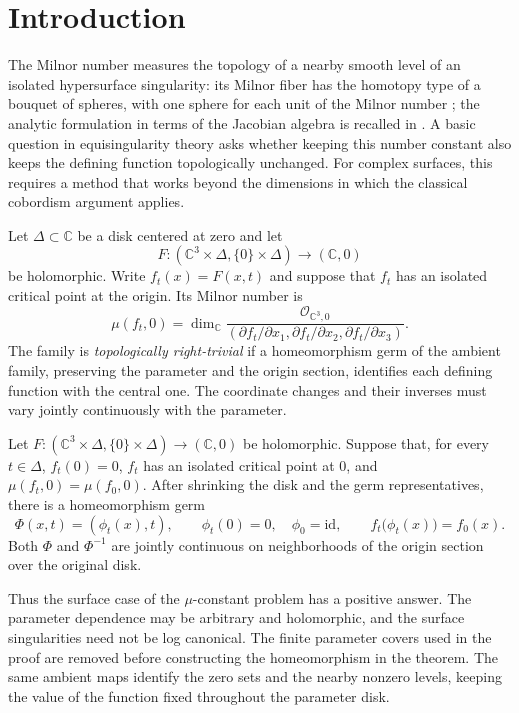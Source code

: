 \section{Introduction}\label{sec:introduction}

The Milnor number measures the topology of a nearby smooth level of an
isolated hypersurface singularity: its Milnor fiber has the homotopy type
of a bouquet of spheres, with one sphere for each unit of the Milnor
number \cite[Theorems~6.5 and~7.2]{Milnor1968}; the analytic
formulation in terms of the Jacobian algebra is recalled in
\cite[Section~1, Theorem~1.5]{LeRamanujam1976}.  A basic question in
equisingularity theory asks whether keeping this number constant also
keeps the defining function topologically unchanged.  For complex
surfaces, this requires a method that works beyond the dimensions in
which the classical cobordism argument applies.

Let $\Delta\subset\mathbb C$ be a disk centered at zero and let
\[
 F:(\mathbb C^3\times\Delta,\{0\}\times\Delta)\longrightarrow(\mathbb C,0)
\]
be holomorphic.  Write $f_t(x)=F(x,t)$ and suppose that $f_t$ has an
isolated critical point at the origin.  Its Milnor number is
\[
 \mu(f_t,0)=\dim_{\mathbb C}
 \frac{\mathcal O_{\mathbb C^3,0}}
 {(\partial f_t/\partial x_1,\partial f_t/\partial x_2,
   \partial f_t/\partial x_3)}.
\]
The family is \emph{topologically right-trivial} if a homeomorphism germ
of the ambient family, preserving the parameter and the origin section,
identifies each defining function with the central one.  The coordinate
changes and their inverses must vary jointly continuously with the
parameter.

\begin{theorem}\label{thm:main}
Let $F:(\mathbb C^3\times\Delta,\{0\}\times\Delta)\to(\mathbb C,0)$
be holomorphic.  Suppose that, for every $t\in\Delta$, $f_t(0)=0$,
$f_t$ has an isolated critical point at $0$, and
$\mu(f_t,0)=\mu(f_0,0)$.  After shrinking the disk and the germ
representatives, there is a homeomorphism germ
\[
 \Phi(x,t)=(\phi_t(x),t),\qquad
 \phi_t(0)=0,\quad \phi_0=\mathrm{id},\qquad
 f_t\bigl(\phi_t(x)\bigr)=f_0(x).
\]
Both $\Phi$ and $\Phi^{-1}$ are jointly continuous on neighborhoods
of the origin section over the original disk.
\end{theorem}

Thus the surface case of the $\mu$-constant problem has a positive
answer.  The parameter dependence may be arbitrary and holomorphic, and
the surface singularities need not be log canonical.  The finite
parameter covers used in the proof are removed before constructing the
homeomorphism in the theorem.  The same ambient maps identify the zero
sets and the nearby nonzero levels, keeping the value of the function
fixed throughout the parameter disk.

